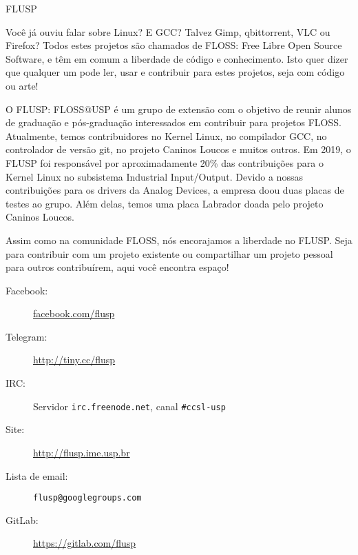 \begin{subsecao}{FLUSP}


Você já ouviu falar sobre Linux? E GCC? Talvez Gimp, qbittorrent, VLC ou Firefox?
Todos estes projetos são chamados de FLOSS: Free Libre Open Source Software, e
têm em comum a liberdade de código e conhecimento. Isto quer dizer que qualquer
um pode ler, usar e contribuir para estes projetos, seja com código ou arte!

O FLUSP: FLOSS@USP é um grupo de extensão com o objetivo de reunir alunos de
graduação e pós-graduação interessados em contribuir para projetos FLOSS.
Atualmente, temos contribuidores no Kernel Linux, no compilador GCC, no controlador
de versão git, no projeto Caninos Loucos e muitos outros. Em 2019, o FLUSP
foi responsável por aproximadamente 20\% das contribuições para o Kernel Linux no
subsistema Industrial Input/Output. Devido a nossas contribuições para os drivers
da Analog Devices, a empresa doou duas placas de testes ao grupo. Além delas, temos
uma placa Labrador doada pelo projeto Caninos Loucos.

Assim como na comunidade FLOSS, nós encorajamos a liberdade no FLUSP. Seja para
contribuir com um projeto existente ou compartilhar um projeto pessoal para
outros contribuírem, aqui você encontra espaço!

\begin{description}
  \item[Facebook:] \url{facebook.com/flusp}
  \item[Telegram:] \url{http://tiny.cc/flusp}
  \item[IRC:] Servidor \texttt{irc.freenode.net}, canal \texttt{\#ccsl-usp}
  \item[Site:] \url{http://flusp.ime.usp.br}
  \item[Lista de email:] \texttt{flusp@googlegroups.com}
  \item[GitLab:] \url{https://gitlab.com/flusp}
\end{description}

\end{subsecao}
